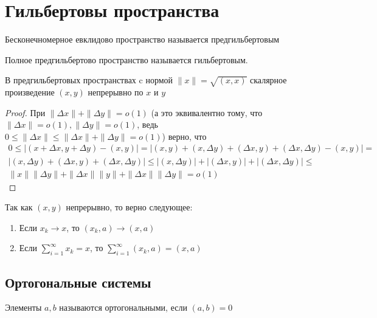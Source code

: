 \documentclass[document.tex]{subfiles}
\begin{document}
\section{Гильбертовы пространства}
\begin{definition}
    Бесконечномерное евклидово пространство называется предгильбертовым
\end{definition}

\begin{definition}
    Полное предгильбертово пространство называется гильбертовым.
\end{definition}

\begin{statement}
    В предгильбертовых пространствах c нормой $\|x\| = \sqrt{(x, x)}$ скалярное произведение $(x, y)$ непрерывно по $x$ и $y$
\end{statement}

\begin{proof}
    При $\|\Delta x\| + \| \Delta y\| = o(1)$ (а это эквивалентно тому, что $\|\Delta x\| = o(1), \|\Delta
    y\| = o(1)$, ведь $0 \leq \|\Delta x\| \leq \|\Delta x \| + \| \Delta y\| = o(1)$) верно, что
    \begin{multline*}
        0 \leq |(x + \Delta x, y + \Delta y) - (x, y)| = |(x, y) + (x, \Delta y) + (\Delta x, y) + (\Delta x, \Delta y) - (x,
        y)| = \\
        |(x, \Delta y) + (\Delta x, y) + (\Delta x, \Delta y)| \leq |(x, \Delta y)| + |(\Delta x, y)| + |(\Delta x,
        \Delta y)| \leq \\
        \| x \| \|\Delta y\| + \|\Delta x\| \|y\| + \|\Delta x\| \|\Delta y\| = o(1)
    \end{multline*}
\end{proof}

\begin{corollary}
    Так как $(x, y)$ непрерывно, то верно следующее:
    \begin{enumerate}
        \item Если $x_k \rightarrow x$, то $(x_k, a) \rightarrow (x, a)$
        \item Если $\sum_{i = 1}^{\infty} x_k = x$, то $\sum_{i = 1}^{\infty} (x_k, a) = (x, a)$
    \end{enumerate}
\end{corollary}

\subsection{Ортогональные системы}
\begin{definition}
    Элементы $a, b$ называются ортогональными, если $(a, b) = 0$
\end{definition}
\end{document}
